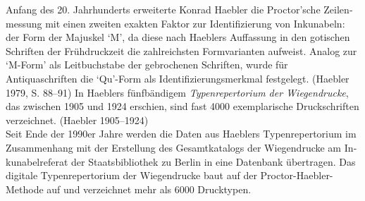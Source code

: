 \documentclass{article}
\begin{document}
        Anfang des 20. Jahrhunderts erweiterte Konrad Haebler die Proctor’sche Zeilen­messung mit einen zweiten exakten Faktor zur Identifizierung von Inkunabeln: der Form der Majuskel ‘M’, da diese nach Haeblers Auf­fassung in den gotischen Schriften der Frühdruckzeit die zahlreichsten Formva­rianten aufweist. Analog zur ‘M-Form’ als Leitbuchstabe der ge­brochenen Schriften, wurde für Antiquaschriften die ‘Qu’-Form als Identifizierungsmerkmal fest­gelegt. (Haebler 1979, S. 88–91) In Haeblers fünfbändigem \emph{Typenrepertorium der Wiegendrucke}, das zwischen 1905 und 1924 er­schien, sind fast 4000 exemplarische Druckschriften verzeichnet. (Haebler 1905–1924)\\
            
        Seit Ende der 1990er Jahre werden die Daten aus Haeblers Typenrepertorium im Zusammenhang mit der Erstellung des Gesamtkatalogs der Wiegendrucke am In­kunabelreferat der Staatsbibliothek zu Berlin in eine Datenbank übertragen. Das digitale Typenrepertorium der Wiegendrucke baut auf der Proctor-Haebler-Methode auf und verzeichnet mehr als 6000 Drucktypen.\\
            
\end{document}

